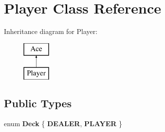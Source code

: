 \hypertarget{class_player}{}\section{Player Class Reference}
\label{class_player}
Inheritance diagram for Player\+:\begin{figure}[H]
\begin{center}
\leavevmode
\includegraphics[height=2.000000cm]{class_player}
\end{center}
\end{figure}
\subsection*{Public Types}
\begin{DoxyCompactItemize}
\item 
\mbox{\label{class_player_a0b45c51be0c5c7f370360b7f4f92976f}} 
enum {\bfseries Deck} \{ {\bfseries D\+E\+A\+L\+ER}, 
{\bfseries P\+L\+A\+Y\+ER}
 \}
\end{DoxyCompactItemize}
